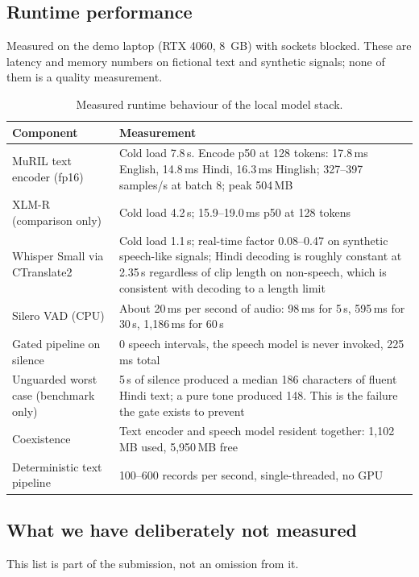 \documentclass[11pt,a4paper]{article}
\begin{document}
\subsection{Runtime performance}
\label{sec:runtimeperf}
Measured on the demo laptop (RTX 4060, 8~GB) with sockets blocked. These are latency and memory
numbers on fictional text and synthetic signals; none of them is a quality measurement.

\begin{table}[!htbp]
\centering\footnotesize
\caption{Measured runtime behaviour of the local model stack.}
\label{tab:perf}
\begin{tabularx}{\linewidth}{@{}>{\raggedright\arraybackslash}p{3.4cm}X@{}}
\toprule
Component & Measurement \\
\midrule
MuRIL text encoder (fp16) & Cold load 7.8\,s. Encode p50 at 128 tokens: 17.8\,ms English, 14.8\,ms
Hindi, 16.3\,ms Hinglish; 327--397 samples/s at batch 8; peak 504\,MB \\
XLM-R (comparison only) & Cold load 4.2\,s; 15.9--19.0\,ms p50 at 128 tokens \\
Whisper Small via CTranslate2 & Cold load 1.1\,s; real-time factor 0.08--0.47 on synthetic
speech-like signals; Hindi decoding is roughly constant at 2.35\,s regardless of clip length on
non-speech, which is consistent with decoding to a length limit \\
Silero VAD (CPU) & About 20\,ms per second of audio: 98\,ms for 5\,s, 595\,ms for 30\,s, 1{,}186\,ms
for 60\,s \\
Gated pipeline on silence & 0 speech intervals, the speech model is never invoked, 225\,ms total \\
Unguarded worst case (benchmark only) & 5\,s of silence produced a median 186 characters of fluent
Hindi text; a pure tone produced 148. This is the failure the gate exists to prevent \\
Coexistence & Text encoder and speech model resident together: 1{,}102\,MB used, 5{,}950\,MB free \\
Deterministic text pipeline & 100--600 records per second, single-threaded, no GPU \\
\bottomrule
\end{tabularx}
\end{table}

\subsection{What we have deliberately not measured}
\label{sec:notmeasured}
This list is part of the submission, not an omission from it.
\end{document}

